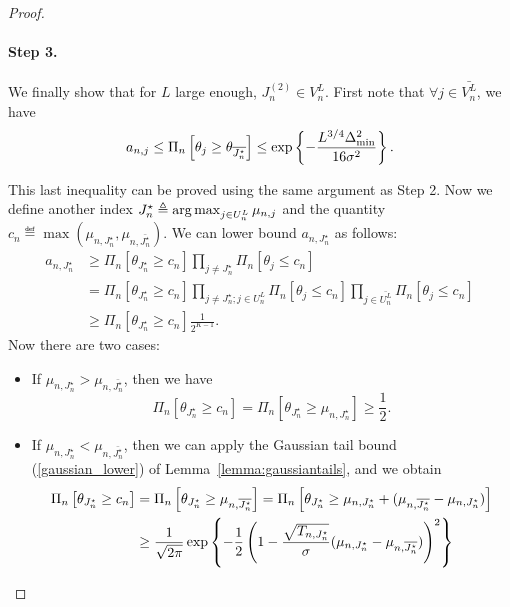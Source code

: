 \begin{proof}
    \paragraph{Step 3.} We finally show that for $L$ large enough, $J_n^{(2)} \in V_n^L$. First note that $\forall j \in \bar{V_n^L}$, we have
    \begin{equation}
                a_{n,j} \leq \Pi_{n}\left[\theta_j \geq \theta_{\overline{J_n^{\star}}}\right] \leq \exp\left\{-\frac{L^{3/4}\Delta_{\text{min}}^2}{16\sigma^2}\right\}. \label{eq:upper_bound_anj_explo}
    \end{equation}

    This last inequality can be proved using the same argument as Step 2. Now we define another index $J_n^\star \triangleq \operatorname*{arg\,max}_{j\in U_n^L}\mu_{n,j}$ and the quantity $c_n \eqdef \max(\mu_{n,J_n^\star},\mu_{n,\bar{J_n^\star}})$. We can lower bound $a_{n,J_n^\star}$ as follows:
    \begin{align*}
        a_{n,J_n^\star} &\geq \Pi_{n}\left[\theta_{J_n^\star}\geq c_n\right]\prod_{j\neq J_n^\star}\Pi_{n}\left[\theta_j\leq c_n\right]\\
                             &= \Pi_{n}\left[\theta_{J_n^\star}\geq c_n\right]\prod_{j\neq J_n^\star;j\in U_n^L}\Pi_{n}\left[\theta_j\leq c_n\right]\prod_{j\in \bar{U_n^L}}\Pi_{n}\left[\theta_j\leq c_n\right]\\
                             &\geq \Pi_{n}\left[\theta_{J_n^\star}\geq c_n\right] \frac{1}{2^{K-1}}.
    \end{align*}
    Now there are two cases:
    \begin{itemize}
        \item If $\mu_{n,J_n^\star} > \mu_{n,\bar{J_n^\star}}$, then we have
        \[
            \Pi_{n}\left[\theta_{J_n^\star}\geq c_n\right] = \Pi_{n}\left[\theta_{J_n^\star}\geq \mu_{n,J_n^\star}\right] \geq \frac{1}{2}.
        \]
        \item If $\mu_{n,J_n^\star} < \mu_{n,\bar{J_n^\star}}$, then we can apply the Gaussian tail bound (\ref{gaussian_lower}) of Lemma~\ref{lemma:gaussiantails}, and we obtain
        \begin{align*}
            \Pi_{n}\left[\theta_{J_n^\star}\geq c_n\right] &= \Pi_{n}\left[\theta_{J_n^\star}\geq \mu_{n,\bar{J_n^\star}}\right] =
            \Pi_{n}\left[\theta_{J_n^\star}\geq \mu_{n,J_n^\star} + (\mu_{n,\bar{J_n^\star}}-\mu_{n,J_n^\star})\right]\\
                                            &\geq
            \frac{1}{\sqrt{2\pi}} \expp{-\frac{1}{2}\left( 1-\frac{\sqrt{T_{n,J_n^\star}}}{\sigma}(\mu_{n,J_n^\star}-\mu_{n,\bar{J_n^\star}}) \right)^2}\\

\end{align*}
\end{itemize}
\end{proof}
